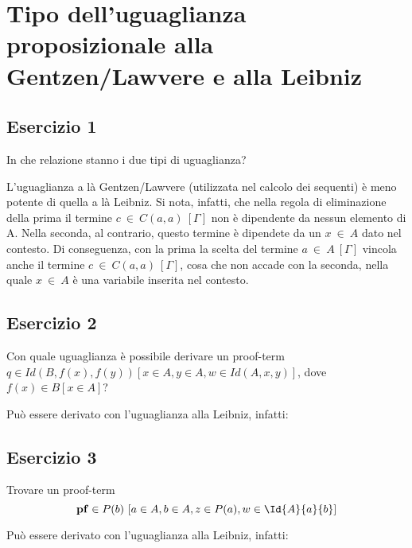 \newpage
\section{Tipo dell'uguaglianza proposizionale alla Gentzen/Lawvere e alla Leibniz}
\subsection{Esercizio 1}
\begin{thm}
	In che relazione stanno i due tipi di uguaglianza?
\end{thm}
L'uguaglianza a là Gentzen/Lawvere (utilizzata nel calcolo dei sequenti) è meno potente di quella a là Leibniz. Si nota, infatti, che nella regola di eliminazione della prima il termine $c~\in~C(a,a)~[\Gamma]$ non è dipendente da nessun elemento di A. Nella seconda, al contrario, questo termine è dipendete da un $x~\in~A$ dato nel contesto. Di conseguenza, con la prima la scelta del termine $a~\in~A~[\Gamma]$ vincola anche il termine $c~\in~C(a,a)~[\Gamma]$, cosa che non accade con la seconda, nella quale $x~\in~A$ è una variabile inserita nel contesto.

\subsection{Esercizio 2}
\begin{thm}
	Con quale uguaglianza è possibile derivare un proof-term $q\in Id(B, f(x), f(y)) [x\in A, y\in A, w\in Id(A, x, y)]$, dove $f(x)\in B[x\in A]$?
\end{thm}
Può essere derivato con l'uguaglianza alla Leibniz, infatti:



\subsection{Esercizio 3}
\begin{thm}\label{thm:ug3} Trovare un proof-term
	\[ \mathbf{pf}\in P(b)\ [a\in A, b\in A, z\in P(a), w\in \Id{A}{a}{b}]\]
\end{thm}
Può essere derivato con l'uguaglianza alla Leibniz, infatti:

